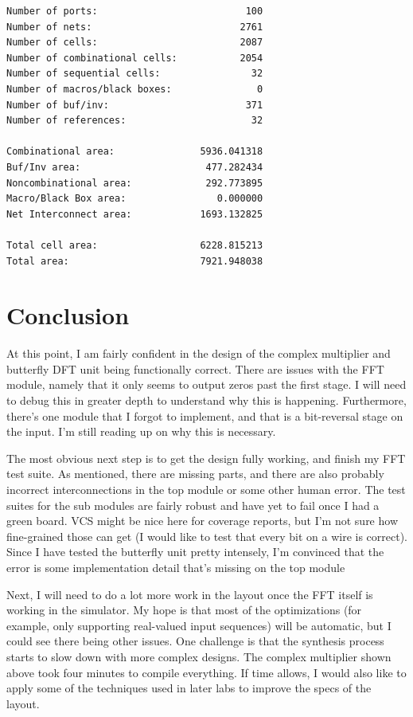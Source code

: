 \documentclass[12pt]{article}
\begin{document}
\begin{verbatim}
Number of ports:                          100
Number of nets:                          2761
Number of cells:                         2087
Number of combinational cells:           2054
Number of sequential cells:                32
Number of macros/black boxes:               0
Number of buf/inv:                        371
Number of references:                      32

Combinational area:               5936.041318
Buf/Inv area:                      477.282434
Noncombinational area:             292.773895
Macro/Black Box area:                0.000000
Net Interconnect area:            1693.132825

Total cell area:                  6228.815213
Total area:                       7921.948038
\end{verbatim}

\newpage
\section{Conclusion}

At this point, I am fairly confident in the design of the complex multiplier
and butterfly DFT unit being functionally correct. There are issues with the
FFT module, namely that it only seems to output zeros past the first stage. I
will need to debug this in greater depth to understand why this is happening.
Furthermore, there's one module that I forgot to implement, and that is a
bit-reversal stage on the input. I'm still reading up on why this is necessary.

The most obvious next step is to get the design fully working, and finish
my FFT test suite. As mentioned, there are missing parts, and there are
also probably incorrect interconnections in the top module or some other
human error. The test suites for the sub modules are fairly robust and
have yet to fail once I had a green board. VCS might be nice here for coverage
reports, but I'm not sure how fine-grained those can get (I would like to test
that every bit on a wire is correct). Since I have tested the butterfly unit
pretty intensely, I'm convinced that the error is some implementation detail
that's missing on the top module

Next, I will need to do a lot more work in the layout once the FFT itself
is working in the simulator. My hope is that most of the optimizations (for
example, only supporting real-valued input sequences) will be automatic, but
I could see there being other issues. One challenge is that the synthesis
process starts to slow down with more complex designs. The complex multiplier
shown above took four minutes to compile everything. If time allows, I would
also like to apply some of the techniques used in later labs to improve
the specs of the layout.
\end{document}
